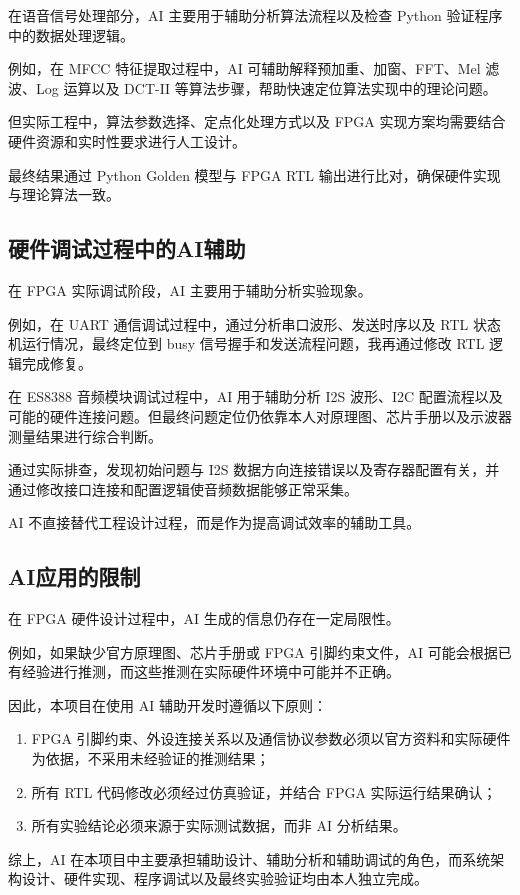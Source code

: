 \documentclass[UTF8,zihao=-4,fontset=windows]{ctexart}
\begin{document}
在语音信号处理部分，AI 主要用于辅助分析算法流程以及检查 Python 验证程序中的数据处理逻辑。

例如，在 MFCC 特征提取过程中，AI 可辅助解释预加重、加窗、FFT、Mel 滤波、Log 运算以及 DCT-II 等算法步骤，帮助快速定位算法实现中的理论问题。

但实际工程中，算法参数选择、定点化处理方式以及 FPGA 实现方案均需要结合硬件资源和实时性要求进行人工设计。

最终结果通过 Python Golden 模型与 FPGA RTL 输出进行比对，确保硬件实现与理论算法一致。

\subsection{硬件调试过程中的AI辅助}

在 FPGA 实际调试阶段，AI 主要用于辅助分析实验现象。

例如，在 UART 通信调试过程中，通过分析串口波形、发送时序以及 RTL 状态机运行情况，最终定位到 busy 信号握手和发送流程问题，我再通过修改 RTL 逻辑完成修复。

在 ES8388 音频模块调试过程中，AI 用于辅助分析 I2S 波形、I2C 配置流程以及可能的硬件连接问题。但最终问题定位仍依靠本人对原理图、芯片手册以及示波器测量结果进行综合判断。

通过实际排查，发现初始问题与 I2S 数据方向连接错误以及寄存器配置有关，并通过修改接口连接和配置逻辑使音频数据能够正常采集。

AI 不直接替代工程设计过程，而是作为提高调试效率的辅助工具。

\subsection{AI应用的限制}

在 FPGA 硬件设计过程中，AI 生成的信息仍存在一定局限性。

例如，如果缺少官方原理图、芯片手册或 FPGA 引脚约束文件，AI 可能会根据已有经验进行推测，而这些推测在实际硬件环境中可能并不正确。

因此，本项目在使用 AI 辅助开发时遵循以下原则：

\begin{enumerate}[leftmargin=2em]
	\item FPGA 引脚约束、外设连接关系以及通信协议参数必须以官方资料和实际硬件为依据，不采用未经验证的推测结果；
	\item 所有 RTL 代码修改必须经过仿真验证，并结合 FPGA 实际运行结果确认；
	\item 所有实验结论必须来源于实际测试数据，而非 AI 分析结果。
\end{enumerate}

综上，AI 在本项目中主要承担辅助设计、辅助分析和辅助调试的角色，而系统架构设计、硬件实现、程序调试以及最终实验验证均由本人独立完成。
\clearpage
\listoffigures
\end{document}
